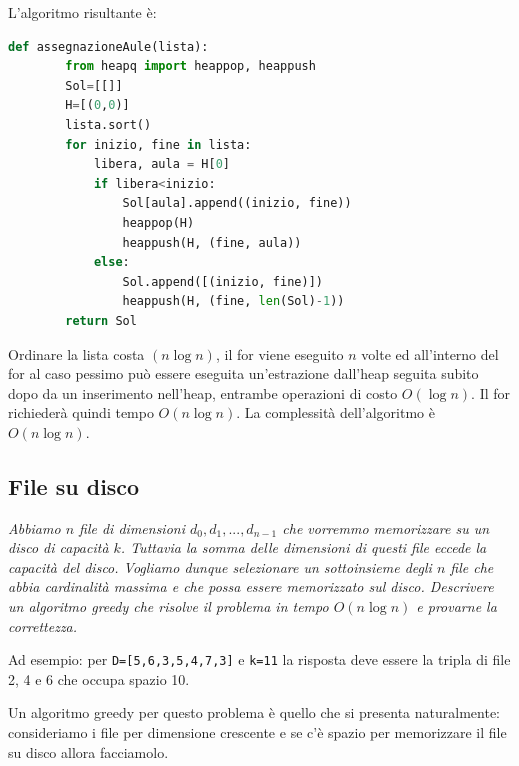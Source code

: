     L'algoritmo risultante è:
    \begin{lstlisting}[language=Python]
    def assegnazioneAule(lista):
        from heapq import heappop, heappush
        Sol=[[]]
        H=[(0,0)]
        lista.sort()
        for inizio, fine in lista:
            libera, aula = H[0]
            if libera<inizio:
                Sol[aula].append((inizio, fine))
                heappop(H)
                heappush(H, (fine, aula))
            else:
                Sol.append([(inizio, fine)])
                heappush(H, (fine, len(Sol)-1))
        return Sol
    \end{lstlisting}    
    Ordinare la lista costa $(n\log n)$, il for viene eseguito $n$ volte ed all'interno del for al caso pessimo può essere eseguita un'estrazione dall'heap seguita subito dopo da un inserimento nell'heap, entrambe operazioni di costo $O(\log n)$. Il for richiederà quindi tempo $O(n\log n)$. La complessità dell'algoritmo è $O(n\log n)$.

\subsection{File su disco}
    \textit{Abbiamo $n$ file di dimensioni $d_0, d_1,..., d_{n-1}$ che vorremmo memorizzare su un disco di capacità $k$. Tuttavia la somma delle dimensioni di questi file eccede la capacità del disco. Vogliamo dunque selezionare un sottoinsieme degli $n$ file che abbia cardinalità massima e che possa essere memorizzato sul disco. Descrivere un algoritmo greedy che risolve il problema in tempo $O(n\log n)$ e provarne la correttezza.}

    Ad esempio: per \verb|D=[5,6,3,5,4,7,3]| e \verb|k=11| la risposta deve essere la tripla di file 2, 4 e 6 che occupa spazio 10.

    Un algoritmo greedy per questo problema è quello che si presenta naturalmente: consideriamo i file per dimensione crescente e se c'è spazio per memorizzare il file su disco allora facciamolo.

